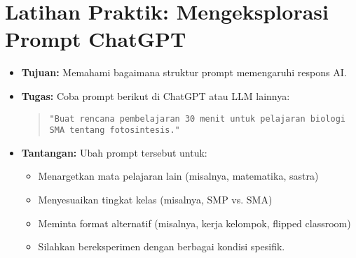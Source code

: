 \section*{Latihan Praktik: Mengeksplorasi Prompt ChatGPT}
\begin{itemize}
	\item \textbf{Tujuan:} Memahami bagaimana struktur prompt memengaruhi respons AI.
	\item \textbf{Tugas:} Coba prompt berikut di ChatGPT atau LLM lainnya:  
	\begin{quote}\centering
		\texttt{"Buat rencana pembelajaran 30 menit untuk pelajaran biologi SMA tentang fotosintesis."}
	\end{quote}
	\item \textbf{Tantangan:} Ubah prompt tersebut untuk:
	\begin{itemize}
		\item Menargetkan mata pelajaran lain (misalnya, matematika, sastra)
		\item Menyesuaikan tingkat kelas (misalnya, SMP vs. SMA)
		\item Meminta format alternatif (misalnya, kerja kelompok, flipped classroom)
		\item Silahkan bereksperimen dengan berbagai kondisi spesifik.
	\end{itemize}
\end{itemize}
